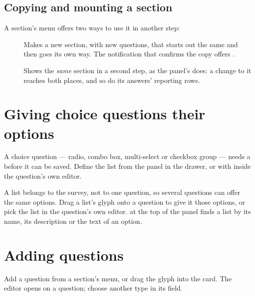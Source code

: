 \documentclass[11pt, a4paper]{article}
\begin{document}
\subsection{Copying and mounting a section}

A section's menu offers two ways to use it in another step:

\begin{description}
  \item[] Makes a new section, with new questions, that starts out the same
        and then goes its own way. The notification that confirms the copy offers .
  \item[] Shows the \emph{same} section in a second step, as the
         panel's  does: a change to it reaches both places, and
        so do its answers' reporting rows.
\end{description}

\section{Giving choice questions their options}
\label{sec:lists}

A choice question — radio, combo box, multi-select or checkbox group — needs a  before it can be saved. Define the list from the  panel in the drawer, or with
 inside the question's own editor.


A list belongs to the survey, not to one question, so several questions can offer the same
options. Drag a list's glyph onto a question to give it those options, or pick the list in the
question's own editor.  at the top of the panel finds a list by its name, its
description or the text of an option.

\section{Adding questions}
\label{sec:questions}

Add a question from a section's menu, or drag the  glyph into the card. The editor
opens on a  question; choose another type in its  field.
\end{document}

